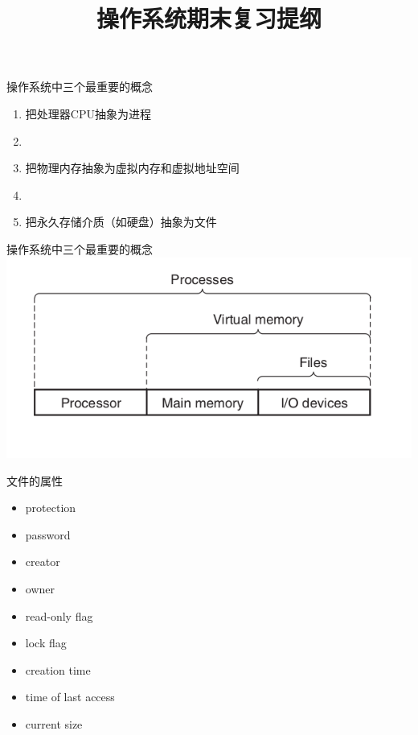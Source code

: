 \documentclass[xcolor=svgnames]{beamer}
\begin{document}
\begin{CJK*}{UTF8}{gbsn}


\title{操作系统期末复习提纲}

\begin{frame}
\maketitle
\end{frame}

\begin{frame}{操作系统中三个最重要的概念}
\begin{enumerate}
\item 把处理器CPU抽象为\alert{进程}
\item[]
\item 把物理内存抽象为虚拟内存和虚拟\alert{地址空间}
\item[]
\item 把永久存储介质（如硬盘）抽象为\alert{文件}
\end{enumerate}
\end{frame}

\begin{frame}{操作系统中三个最重要的概念}
\includegraphics[width=1.0\textwidth]{osabstractions.png}
\end{frame}

\begin{frame}{文件的属性}
\begin{itemize}
\item protection
\item password
\item creator
\item owner
\item read-only flag
\item lock flag
\item creation time
\item time of last access
\item current size
\end{itemize}
\end{frame}


\end{CJK*}
\end{document}
